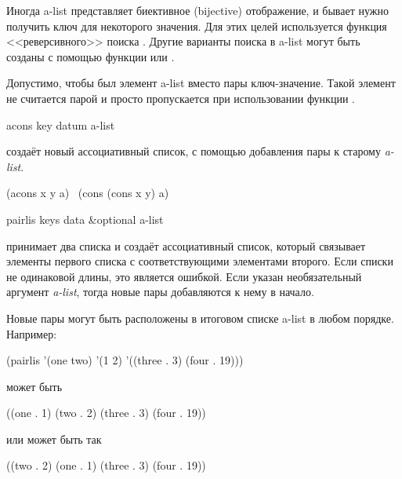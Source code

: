 Иногда a-list представляет биективное (bijective) отображение, и бывает нужно
получить ключ для некоторого значения. Для этих целей используется функция
<<реверсивного>> поиска . Другие варианты поиска в a-list могут быть
созданы с помощью функции  или .

Допустимо, чтобы {\false} был элемент a-list вместо пары ключ-значение.
Такой элемент не считается парой и просто пропускается при использовании
функции .

\begin{defun}[Функция]
acons key datum a-list

 создаёт новый ассоциативный список, с помощью добавления пары
 к старому \emph{a-list}.
\begin{lisp}
(acons x y a) \EQ\ (cons (cons x y) a)
\end{lisp}
\end{defun}

\begin{defun}[Функция]
pairlis keys data &optional a-list

 принимает два списка и создаёт ассоциативный список, который
связывает элементы первого списка с соответствующими элементами второго. Если
списки не одинаковой длины, это является ошибкой. Если указан необязательный
аргумент \emph{a-list}, тогда новые пары добавляются к нему в начало.

Новые пары могут быть расположены в итоговом списке a-list в любом порядке.
Например:
\begin{lisp}
(pairlis '(one two) '(1 2) '((three . 3) (four . 19)))
\end{lisp}
может быть
\begin{lisp}
((one . 1) (two . 2) (three . 3) (four . 19))
\end{lisp}
или может быть так
\begin{lisp}
((two . 2) (one . 1) (three . 3) (four . 19))
\end{lisp}
\end{defun}

